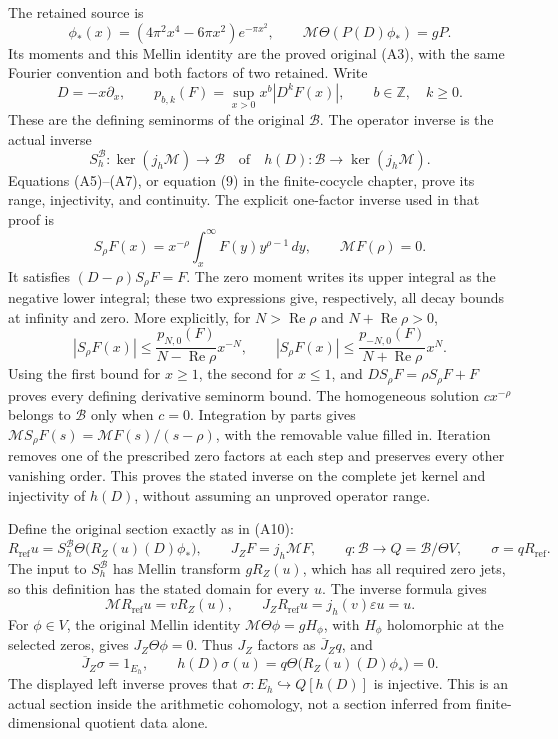 The retained source is
\[
 \phi_*(x)=(4\pi^2x^4-6\pi x^2)e^{-\pi x^2},\qquad
 \mathcal M\Theta(P(D)\phi_*)=gP.
\]
Its moments and this Mellin identity are the proved original (A3), with
the same Fourier convention and both factors of two retained. Write
\[
 D=-x\partial_x,\qquad
 p_{b,k}(F)=\sup_{x>0}x^b|D^kF(x)|,
 \qquad b\in\mathbb Z,\quad k\geq0.
\]
These are the defining seminorms of the original \(\mathscr B\).
The operator inverse is the actual inverse
\[
 S_h^{\mathscr B}:\ker(j_h\mathcal M)\longrightarrow\mathscr B
 \quad\text{of}\quad h(D):\mathscr B\longrightarrow\ker(j_h\mathcal M).
\]
Equations (A5)--(A7), or equation (9) in the finite-cocycle chapter, prove
its range, injectivity, and continuity. The explicit one-factor inverse
used in that proof is
\[
 S_\rho F(x)=x^{-\rho}\int_x^\infty F(y)y^{\rho-1}\,dy,
 \qquad \mathcal MF(\rho)=0.
\]
It satisfies \((D-\rho)S_\rho F=F\). The zero moment writes its upper
integral as the negative lower integral; these two expressions give,
respectively, all decay bounds at infinity and zero. More explicitly,
for \(N>\operatorname{Re}\rho\) and \(N+\operatorname{Re}\rho>0\),
\[
 |S_\rho F(x)|\leq
 \frac{p_{N,0}(F)}{N-\operatorname{Re}\rho}x^{-N},\qquad
 |S_\rho F(x)|\leq
 \frac{p_{-N,0}(F)}{N+\operatorname{Re}\rho}x^N.
\]
Using the first bound for \(x\geq1\), the second for \(x\leq1\), and
\(DS_\rho F=\rho S_\rho F+F\) proves every defining derivative seminorm
bound. The homogeneous solution \(cx^{-\rho}\) belongs to \(\mathscr B\)
only when \(c=0\). Integration by parts gives
\(\mathcal MS_\rho F(s)=\mathcal MF(s)/(s-\rho)\), with the removable
value filled in. Iteration removes one of the prescribed zero factors
at each step and preserves every other vanishing order. This proves the
stated inverse on the complete jet kernel and injectivity of \(h(D)\),
without assuming an unproved operator range.

Define the original section exactly as in (A10):
\[
 R_{\mathrm{ref}}u
 =S_h^{\mathscr B}\Theta\bigl(R_Z(u)(D)\phi_*\bigr),\qquad
 J_ZF=j_h\mathcal MF,\qquad
 q:\mathscr B\longrightarrow Q=\mathscr B/\Theta V,
 \qquad \sigma=qR_{\mathrm{ref}}.
\]
The input to \(S_h^{\mathscr B}\) has Mellin transform \(gR_Z(u)\),
which has all required zero jets, so this definition has the stated
domain for every \(u\). The inverse formula gives
\[
 \mathcal MR_{\mathrm{ref}}u=vR_Z(u),\qquad
 J_ZR_{\mathrm{ref}}u=j_h(v)\varepsilon u=u.
\]
For \(\phi\in V\), the original Mellin identity
\(\mathcal M\Theta\phi=gH_\phi\), with \(H_\phi\) holomorphic at the
selected zeros, gives \(J_Z\Theta\phi=0\). Thus \(J_Z\) factors as
\(\overline J_Zq\), and
\[
 \overline J_Z\sigma=1_{E_h},\qquad
 h(D)\sigma(u)=q\Theta\bigl(R_Z(u)(D)\phi_*\bigr)=0.
\]
The displayed left inverse proves that
\(\sigma:E_h\hookrightarrow Q[h(D)]\) is injective. This is an actual
section inside the arithmetic cohomology, not a section inferred from
finite-dimensional quotient data alone.

